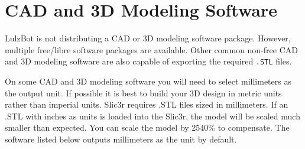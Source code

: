 \begin{comment}
\subsection{Loading print files}
\index{load files}
\index{gcode}
\index{Printrun}

To load a \texttt{.gcode} file into Printrun click the \texttt{Load file} button. Navigate to the \texttt{.gcode} file in the file browser and click \texttt{Open}. You will now see a 2D image of the first layer of your model design in the .gcode viewer
(Figure \ref{fig:Printrun_viewer}, page \pageref{fig:Printrun_viewer}).
\begin{figure}[hbt]
\centering
\texttt{[image: printrun\_viewer.png]}
\caption{Printrun viewer}
\label{fig:Printrun_viewer}
\end{figure}
Click the .gcode viewer window to see a more detailed version of the sliced model. In the pop-up .gcode viewer you can zoom in using the mouse scroll wheel and flip through layers with the up and down arrow keys. To pan within the window, left-click and drag to move around the work plane. The lines shown in the .gcode viewer represent the path the extrusion nozzle will follow to print the model.

For more information on using Printrun, see the Printrun page in the Support/Downloads section at \texttt{https://www.lulzbot.com/?q=support}. Instructions for running a print can be found in the Starting the First Print section in this manual.
\end{comment}

\section{CAD and 3D Modeling Software}

LulzBot is not distributing a CAD or 3D modeling software package. However, multiple free/libre software packages are available. Other common non-free CAD and 3D modeling software are also capable of exporting the required \texttt{.STL} files.

On some CAD and 3D modeling software you will need to select millimeters as the output unit. If possible it is best to build your 3D design in metric units rather than imperial units. Slic3r requires .STL files sized in millimeters. If an .STL with inches as units is loaded into the Slic3r, the model will be scaled much smaller than expected. You can scale the model by 2540\% to compensate. The software listed below outputs millimeters as the unit by default.


